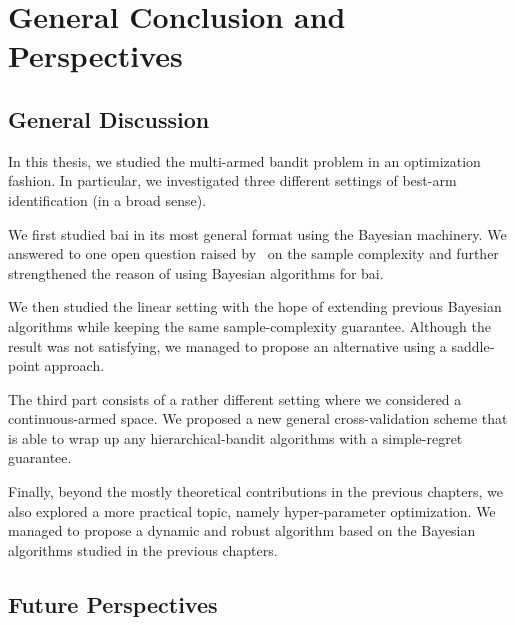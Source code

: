 \chapter{General Conclusion and Perspectives}\label{CHAP:CONCLUSION}
	\minitoc
	\newpage


\section{General Discussion} 

In this thesis, we studied the multi-armed bandit problem in an optimization fashion. In particular, we investigated three different settings of best-arm identification (in a broad sense). 

We first studied \gls{bai} in its most general format using the Bayesian machinery. We answered to one open question raised by~\cite{russo2016ttts} on the sample complexity and further strengthened the reason of using Bayesian algorithms for \gls{bai}.

We then studied the linear setting with the hope of extending previous Bayesian algorithms while keeping the same sample-complexity guarantee. Although the result was not satisfying, we managed to propose an alternative using a saddle-point approach.

The third part consists of a rather different setting where we considered a continuous-armed space. We proposed a new general cross-validation scheme that is able to wrap up any hierarchical-bandit algorithms with a simple-regret guarantee.

Finally, beyond the mostly theoretical contributions in the previous chapters, we also explored a more practical topic, namely hyper-parameter optimization. We managed to propose a dynamic and robust algorithm based on the Bayesian algorithms studied in the previous chapters.

\section{Future Perspectives}

